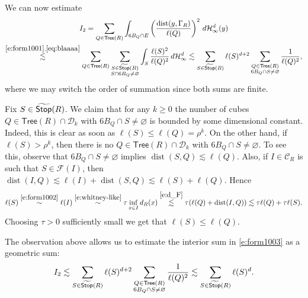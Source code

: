 \documentclass[11pt,reqno]{amsart}
\def\cC{{\mathscr{C}}}
\def\cF{{\mathscr{F}}}
\newcommand{\Tree}{\mathsf{Tree}}
\def\dist{\mathop\mathrm{dist}} 						%
\theoremstyle{definition}
\theoremstyle{remark}
\numberwithin{equation}{section}
\newcommand{\hdc}{\mathcal{H}^d_\infty}
\newcommand{\DD}{\mathcal{D}}
\theoremstyle{theorem}
\theoremstyle{definition}
\theoremstyle{remark}
\numberwithin{equation}{section}
\begin{document}
	We can now estimate
	\begin{multline}
	I_2= \sum_{Q \in \Tree(R)} \int_{6B_Q \cap E} \left( \frac{\dist(y, \Gamma_R)}{\ell(Q)} \right)^2	\, d \hdc(y) \\
	\stackrel{\eqref{e:form1001},\eqref{eq:blaaaa}}{\lesssim} \sum_{Q \in \Tree(R)} \sum_{\substack{S \in \wstop(R)\\ S \cap 6B_Q \neq \varnothing}} \int_S \frac{\ell(S)^{2}}{\ell(Q)^{2}} \, d \hdc
	 \lesssim \sum_{S \in \wstop(R)} \ell(S)^{d+2} \sum_{\substack{Q \in \Tree(R) \\ 6B_Q \cap S \neq \varnothing}} \frac{1}{\ell(Q)^2},\label{e:form1003}
		\end{multline}
	where we may switch the order of summation since both sums are finite.
	
	Fix $S \in \widetilde{\mathsf{Stop}}(R)$. We claim that for any $k\ge 0$ the number of cubes $Q \in \Tree(R)\cap\DD_k$ with $6B_Q\cap S\neq\varnothing$ is bounded by some dimensional constant. Indeed, this is clear as soon as $\ell(S)\le \ell(Q)=\rho^k$. On the other hand, if $\ell(S)> \rho^k$, then there is no $Q \in \Tree(R)\cap\DD_k$ with $6B_Q\cap S\neq\varnothing$. To see this, observe that $6B_Q\cap S\neq\varnothing$ implies $\dist(S, Q) \lesssim \ell(Q)$. Also, if $I \in \cC_R$ is such that $S \in \cF(I)$, then $\dist(I, Q) \lesssim \ell(I) + \dist(S, Q) \lesssim \ell(S) + \ell(Q)$. Hence
	\begin{equation*}
		\ell(S) \stackrel{\eqref{e:form1002}} {\sim} \ell(I)  \stackrel{\eqref{e:whitney-like}}{\sim} \tau \inf_{x\in I} d_R(x) \stackrel{\eqref{e:d_F}}{\lesssim}  \tau (\ell(Q) + \dist(I, Q)) \lesssim \tau \ell(Q) + \tau \ell(S).
	\end{equation*}
	Choosing $\tau>0$ sufficiently small we get that $\ell(S) \le \ell(Q)$. 
	
	The observation above allows us to estimate the interior sum in \eqref{e:form1003} as a geometric sum:
	\begin{equation*}
		I_2\lesssim \sum_{S \in \wstop(R)} \ell(S)^{d+2} \sum_{\substack{Q \in \Tree(R) \\ 6B_Q \cap S \neq \varnothing}} \frac{1}{\ell(Q)^2}\lesssim \sum_{S \in \wstop(R)} \ell(S)^{d}.
	\end{equation*}
	
\end{document}
